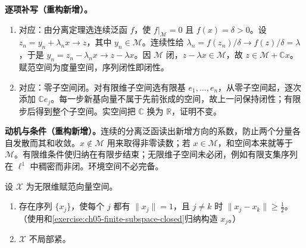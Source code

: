 \documentclass[../../main.tex]{subfiles}
\begin{document}
\begin{solution}
\textbf{逐项补写（重构新增）。}
\begin{enumerate}
\item 对应：由分离定理选连续泛函 $f$，使 $f|_{\mathcal M}=0$ 且 $f(x)=\delta>0$。设 $z_n=y_n+\lambda_nx\to z$，其中 $y_n\in\mathcal M$。连续性给 $\lambda_n=f(z_n)/\delta\to f(z)/\delta=\lambda$，于是 $y_n=z_n-\lambda_nx\to z-\lambda x$。因 $\mathcal M$ 闭，$z-\lambda x\in\mathcal M$，故 $z\in\mathcal M+\mathbb Cx$。赋范空间为度量空间，序列闭性即闭性。
\item 对应：零子空间闭。对有限维子空间选有限基 $e_1,\ldots,e_n$，从零子空间起，逐次添加 $\mathbb Ce_j$。每一步新基向量不属于先前张成的空间，故上一问保持闭性；有限步后得到整个子空间。实空间把 $\mathbb C$ 换为 $\mathbb R$，证明不变。
\end{enumerate}
\end{solution}
\begin{remark}
\textbf{动机与条件（重构新增）。}连续的分离泛函读出新增方向的系数，防止两个分量各自发散而其和收敛。$x\notin\mathcal M$ 用来取得非零读数；若 $x\in\mathcal M$，和空间本来就等于 $\mathcal M$。有限维条件使归纳在有限步结束；无限维子空间未必闭，例如有限支集序列在 $\ell^1$ 中稠密而非闭。环境空间不必完备。
\end{remark}
\begin{exercise}\label{exercise:ch05-infinite-dimension-noncompact}
设 $\mathcal X$ 为无限维赋范向量空间。
\begin{enumerate}
\item\label{item:ch05-separated-unit-sequence} 存在序列 $\{x_j\}$，使每个 $j$ 都有 $\|x_j\|=1$，且 $j\ne k$ 时 $\|x_j-x_k\|\ge\frac12$。（使用和\cref{exercise:ch05-finite-subspace-closed}归纳构造 $x_j$。）
\item\label{item:ch05-no-local-compactness} $\mathcal X$ 不局部紧。
\end{enumerate}
\end{exercise}
\end{document}
